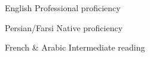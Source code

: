 
\begin{cvskills}

  \cvskill
    {English} %
    {Professional proficiency} %

  \cvskill
    {Persian/Farsi} %
    {Native proficiency} %
    
  \cvskill
    {French \& Arabic} %
    {Intermediate reading} %
\end{cvskills}

